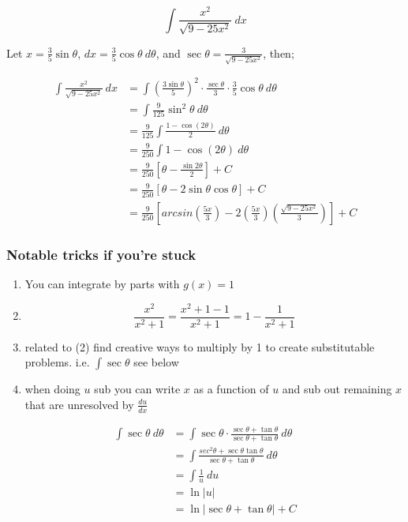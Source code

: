 \documentclass{article}
\begin{document}
\begin{multicols}{2}
\[
	\int \frac{x^2}{\sqrt{9-25x^2}}\ dx
\]


Let $x = \frac{3}{5} \sin \theta$, $dx = \frac{3}{5} \cos \theta \ d\theta$, and $\sec \theta = \frac{3}{\sqrt{9-25x^2}}$, then;

\begin{align*}
	\int \frac{x^2}{\sqrt{9-25x^2}}\ dx &= \int \left( \frac{3 \sin \theta}{5}\right)^2 \cdot \frac{\sec \theta}{3} \cdot \frac{3}{5}\cos \theta \ d \theta \\
					    &= \int \frac{9}{125} \sin^2 \theta \ d \theta \\
					    &= \frac{9}{125} \int \frac{1-\cos(2 \theta)}{2} \ d \theta \\
					    &= \frac{9}{250} \int 1 - \cos(2 \theta) \ d \theta \\
					    &= \frac{9}{250} \left[ \theta - \frac{\sin 2\theta}{2} \right] + C \\
					    &= \frac{9}{250} \left[ \theta - 2 \sin \theta \cos \theta \right] + C \\
					    &= \frac{9}{250} \left[ arcsin\left(\frac{5x}{3}\right) - 2\left(\frac{5x}{3}\right)\left(\frac{\sqrt{9-25x^2}}{3} \right) \right] + C
\end{align*}

\subsubsection*{Notable tricks if you're stuck}
\begin{enumerate}
	\item You can integrate by parts with $g(x) = 1$
	\item \[ \frac{x^2}{x^2+1} = \frac{x^2 + 1 - 1}{x^2 +1} = 1 - \frac{1}{x^2+1} \]
	\item related to (2) find creative ways to multiply by 1 to create substitutable problems. i.e. $\int \sec \theta$ see below
	\item when doing $u$ sub you can write $x$ as a function of $u$ and sub out remaining $x$ that are unresolved by $\frac{du}{dx}$
\end{enumerate}

\begin{align*}
	\int \sec \theta \ d \theta &= \int \sec \theta \cdot \frac{\sec \theta + \tan \theta}{\sec \theta + \tan \theta} \ d \theta \\
				    &= \int \frac{sec^2 \theta + \sec \theta \tan \theta}{\sec \theta + \tan \theta} \ d \theta \\
				    &= \int \frac{1}{u} \ du \\
				    &= \ln|u| \\
				    &= \ln|\sec \theta + \tan \theta | + C
\end{align*}


\end{multicols}
\end{document}
